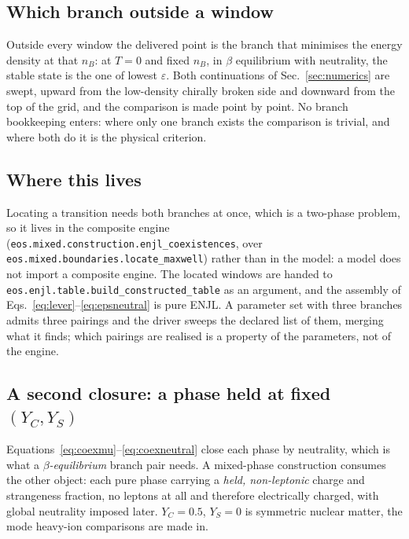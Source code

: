 \documentclass[aps,prc,onecolumn,superscriptaddress,nofootinbib,10pt]{revtex4-2}
\newcommand{\nB}{n_B}
\begin{document}
\subsection{Which branch outside a window}

Outside every window the delivered point is the branch that minimises the
energy density at that $\nB$: at $T = 0$ and fixed $\nB$, in $\beta$
equilibrium with neutrality, the stable state is the one of lowest
$\varepsilon$. Both continuations of Sec.~\ref{sec:numerics} are swept, upward
from the low-density chirally broken side and downward from the top of the
grid, and the comparison is made point by point. No branch bookkeeping enters:
where only one branch exists the comparison is trivial, and where both do it is
the physical criterion.

\subsection{Where this lives}

Locating a transition needs both branches at once, which is a two-phase
problem, so it lives in the composite engine
(\texttt{eos.mixed.construction.enjl\_coexistences}, over
\texttt{eos.mixed.boundaries.locate\_maxwell}) rather than in the model: a
model does not import a composite engine. The located windows are handed to
\texttt{eos.enjl.table.build\_constructed\_table} as an argument, and the
assembly of Eqs.~\eqref{eq:lever}--\eqref{eq:epsneutral} is pure ENJL. A
parameter set with three branches admits three pairings and the driver sweeps
the declared list of them, merging what it finds; which pairings are realised
is a property of the parameters, not of the engine.

\subsection{A second closure: a phase held at fixed $(Y_C, Y_S)$}
\label{sec:coexcomp}

Equations~\eqref{eq:coexmu}--\eqref{eq:coexneutral} close each phase by
neutrality, which is what a \emph{$\beta$-equilibrium} branch pair needs. A
mixed-phase construction consumes the other object: each pure phase carrying a
\emph{held, non-leptonic} charge and strangeness fraction, no leptons at all
and therefore electrically charged, with global neutrality imposed later.
$Y_C = 0.5$, $Y_S = 0$ is symmetric nuclear matter, the mode heavy-ion
comparisons are made in.
\end{document}
